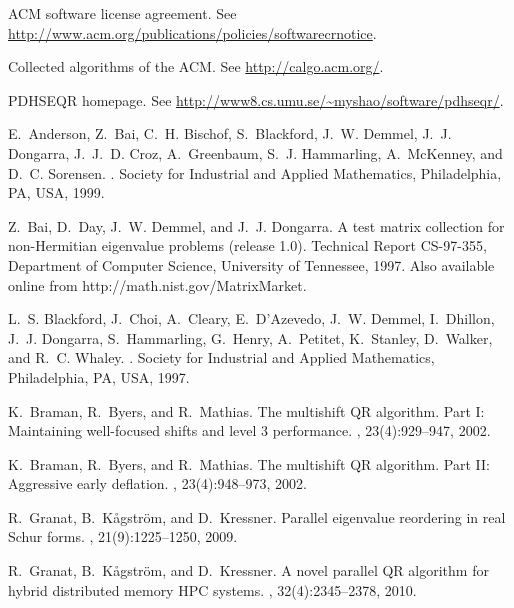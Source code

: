 \documentclass{article}
\begin{document}
\begin{thebibliography}{10}

{ACM} software license agreement.
\newblock See \url{http://www.acm.org/publications/policies/softwarecrnotice}.

Collected algorithms of the {ACM}.
\newblock See \url{http://calgo.acm.org/}.

{PDHSEQR} homepage.
\newblock See \url{http://www8.cs.umu.se/~myshao/software/pdhseqr/}.

E.~Anderson, Z.~Bai, C.~H. Bischof, S.~Blackford, J.~W. Demmel, J.~J. Dongarra,
  J.~J.~D. Croz, A.~Greenbaum, S.~J. Hammarling, A.~McKenney, and D.~C.
  Sorensen.
.
\newblock Society for Industrial and Applied Mathematics, Philadelphia, PA,
  USA, 1999.

Z.~Bai, D.~Day, J.~W. Demmel, and J.~J. Dongarra.
\newblock A test matrix collection for non-{Hermitian} eigenvalue problems
  (release 1.0).
\newblock Technical Report CS-97-355, Department of Computer Science,
  University of Tennessee, 1997.
\newblock Also available online from http://math.nist.gov/MatrixMarket.

L.~S. Blackford, J.~Choi, A.~Cleary, E.~D'Azevedo, J.~W. Demmel, I.~Dhillon,
  J.~J. Dongarra, S.~Hammarling, G.~Henry, A.~Petitet, K.~Stanley, D.~Walker,
  and R.~C. Whaley.
.
\newblock Society for Industrial and Applied Mathematics, Philadelphia, PA,
  USA, 1997.

K.~Braman, R.~Byers, and R.~Mathias.
\newblock The multishift {QR} algorithm. {Part I}: Maintaining well-focused
  shifts and level 3 performance.
, 23(4):929--947, 2002.

K.~Braman, R.~Byers, and R.~Mathias.
\newblock The multishift {QR} algorithm. {Part II}: Aggressive early deflation.
, 23(4):948--973, 2002.

R.~Granat, B.~K{\aa}gstr\"om, and D.~Kressner.
\newblock Parallel eigenvalue reordering in real {Schur} forms.
, 21(9):1225--1250,
  2009.

R.~Granat, B.~K{\aa}gstr\"om, and D.~Kressner.
\newblock A novel parallel {QR} algorithm for hybrid distributed memory {HPC}
  systems.
, 32(4):2345--2378, 2010.


\end{thebibliography}
\end{document}
